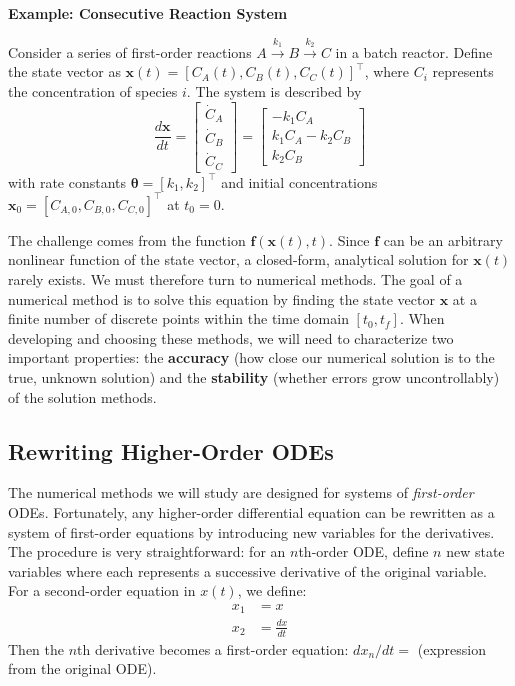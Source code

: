 \begin{exampleBox}
    \textbf{Example: Consecutive Reaction System}
    
    Consider a series of first-order reactions $A \xrightarrow{k_1} B \xrightarrow{k_2} C$ in a batch reactor. Define the state vector as $\mathbf{x}(t) = [C_A(t), C_B(t), C_C(t)]^\top$, where $C_i$ represents the concentration of species $i$. The system is described by
    \begin{equation}
    \frac{d\mathbf{x}}{dt} = \begin{bmatrix} \dot{C}_A \\ \dot{C}_B \\ \dot{C}_C \end{bmatrix} = \begin{bmatrix} -k_1 C_A \\ k_1 C_A - k_2 C_B \\ k_2 C_B \end{bmatrix}
    \end{equation}
    with rate constants $\boldsymbol{\theta} = [k_1, k_2]^\top$ and initial concentrations $\mathbf{x}_0 = [C_{A,0}, C_{B,0}, C_{C,0}]^\top$ at $t_0 = 0$.
\end{exampleBox}

The challenge comes from the function $\mathbf{f}(\mathbf{x}(t), t)$. Since $\mathbf{f}$ can be an arbitrary nonlinear function of the state vector, a closed-form, analytical solution for $\mathbf{x}(t)$ rarely exists. We must therefore turn to numerical methods. The goal of a numerical method is to solve this equation by finding the state vector $\mathbf{x}$ at a finite number of discrete points within the time domain $[t_0, t_f]$. When developing and choosing these methods, we will need to characterize two important properties: the \textbf{accuracy} (how close our numerical solution is to the true, unknown solution) and the \textbf{stability} (whether errors grow uncontrollably) of the solution methods.

\subsection{Rewriting Higher-Order ODEs}
The numerical methods we will study are designed for systems of \textit{first-order} ODEs. Fortunately, any higher-order differential equation can be rewritten as a system of first-order equations by introducing new variables for the derivatives. The procedure is very straightforward: for an $n$th-order ODE, define $n$ new state variables where each represents a successive derivative of the original variable. For a second-order equation in $x(t)$, we define:
\begin{align}
    x_1 &= x \\
    x_2 &= \frac{dx}{dt}
\end{align}
Then the $n$th derivative becomes a first-order equation: $dx_n/dt = $ (expression from the original ODE).

